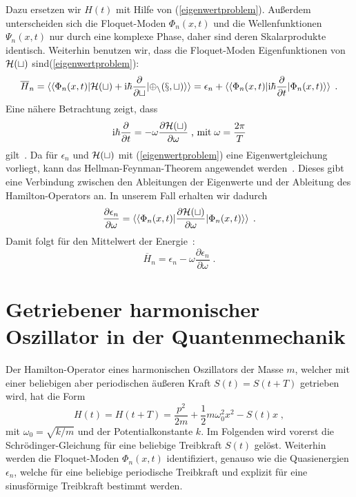     Dazu ersetzen wir $H(t)$ mit Hilfe von (\ref{eigenwertproblem}).
    Außerdem unterscheiden sich die Floquet-Moden $\Phi_n(x,t)$ und die Wellenfunktionen $\Psi_n(x,t)$ nur durch eine komplexe Phase, daher sind deren Skalarprodukte identisch.
    Weiterhin benutzen wir, dass die Floquet-Moden Eigenfunktionen von $\cal{H}(t)$ sind(\ref{eigenwertproblem}):
    \begin{align}
      \begin{split}
      \overline{H}_n  = \braket{\braket{\Phi_n(x,t)|\cal{H}(t)+\text{i}\hbar\frac{\partial}{\partial t}|\Phi_n(x,t)}}
      = \epsilon_n + \braket{\braket{\Phi_n(x,t)|\text{i}\hbar\frac{\partial}{\partial t}|\Phi_n(x,t)}} \; .
    \end{split}
    \end{align}
    Eine nähere Betrachtung zeigt, dass
    \begin{equation}
      \text{i}\hbar\frac{\partial}{\partial t} = -\omega \frac{\partial \cal{H}(t)}{\partial \omega} \;\text{, mit}\; \omega=\frac{2\pi}{T}
    \end{equation}
    gilt~\cite{haengi}.
    Da für $\epsilon_n$ und $\cal H(t)$ mit (\ref{eigenwertproblem}) eine Eigenwertgleichung vorliegt, kann das Hellman-Feynman-Theorem angewendet werden~\cite{hellmann}.
    Dieses gibt eine Verbindung zwischen den Ableitungen der Eigenwerte und der Ableitung des Hamilton-Operators an.
    In unserem Fall erhalten wir dadurch
    \begin{equation}
      \frac{\partial \epsilon_n}{\partial \omega} = \braket{\braket{\Phi_n(x,t)|\frac{\partial \cal H(t)}{\partial \omega}|\Phi_n(x,t)}} \; .
    \end{equation}
    Damit folgt für den Mittelwert der Energie~\cite{haengi}:
    \begin{equation}
      \overline{H}_n = \epsilon_n - \omega\frac{\partial \epsilon_n}{\partial \omega} \; .
      \label{mittleres_H}
    \end{equation}

\iffalse
    \chapter{Getriebener harmonischer Oszillator in der Quantenmechanik}
      Der Hamilton-Operator eines harmonischen Oszillators der Masse $m$, welcher mit einer beliebigen aber periodischen äußeren Kraft $S(t)=S(t+T)$ getrieben wird, hat die Form
      \begin{equation}
        H(t) = H(t+T) = \frac{p^2}{2m} + \frac{1}{2}m\omega_0^2x^2-S(t)x \; ,
        \label{H_einzelner}
      \end{equation}
      mit $\omega_0=\sqrt{k/m}$ und der Potentialkonstante $k$.
      Im Folgenden wird vorerst die Schrödinger-Gleichung für eine beliebige Treibkraft $S(t)$ gelöst.
      Weiterhin werden die Floquet-Moden $\Phi_n(x,t)$ identifiziert, genauso wie die Quasienergien $\epsilon_n$, welche für eine beliebige periodische Treibkraft und explizit für eine sinusförmige Treibkraft bestimmt werden.

